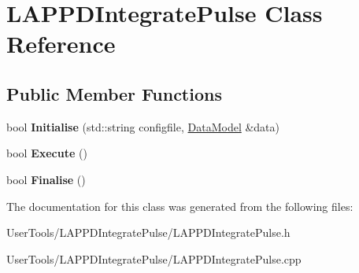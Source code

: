 \hypertarget{classLAPPDIntegratePulse}{
\section{LAPPDIntegratePulse Class Reference}
\label{classLAPPDIntegratePulse}
}
\subsection*{Public Member Functions}
\begin{DoxyCompactItemize}
\item 
\hypertarget{classLAPPDIntegratePulse_ab68036bfa8f3ae98552907590df7d57a}{
bool {\bfseries Initialise} (std::string configfile, \hyperlink{classDataModel}{DataModel} \&data)}
\label{classLAPPDIntegratePulse_ab68036bfa8f3ae98552907590df7d57a}

\item 
\hypertarget{classLAPPDIntegratePulse_ada15e2fbf5c978255a848d0e8dce064a}{
bool {\bfseries Execute} ()}
\label{classLAPPDIntegratePulse_ada15e2fbf5c978255a848d0e8dce064a}

\item 
\hypertarget{classLAPPDIntegratePulse_ab17c0fe3193abd1970c6148049bacc18}{
bool {\bfseries Finalise} ()}
\label{classLAPPDIntegratePulse_ab17c0fe3193abd1970c6148049bacc18}

\end{DoxyCompactItemize}


The documentation for this class was generated from the following files:\begin{DoxyCompactItemize}
\item 
UserTools/LAPPDIntegratePulse/LAPPDIntegratePulse.h\item 
UserTools/LAPPDIntegratePulse/LAPPDIntegratePulse.cpp\end{DoxyCompactItemize}

